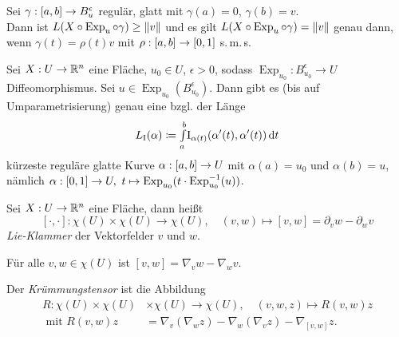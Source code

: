 \documentclass{cheat-sheet}
\newcommand{\FFI}{\mathrm{I}} %
\DeclareMathOperator{\Exp}{Exp} %
\begin{document}

\begin{satz}
  Sei $\gamma : \left[ a, b \right] \to B_u^\epsilon$ regulär, glatt mit $\gamma(a) = 0$, $\gamma(b) = v$. \\
  Dann ist $L(X \circ \Exp_u \circ \gamma) \geq \norm{v}$ und es gilt $L(X \circ \Exp_u \circ \gamma) = \norm{v}$ genau dann, wenn $\gamma(t) = \rho(t)v$ mit $\rho : \left[ a, b \right] \to \left[ 0, 1 \right]$ s.\,m.\,s.
\end{satz}

\begin{satz}
  Sei $X : U \to \mathbb{R}^n$ eine Fläche, $u_0 \in U$, $\epsilon > 0$, sodass $\Exp_{u_0} : B_{u_0}^{\epsilon} \to U$ Diffeomorphismus. Sei $u \in \Exp_{u_0}(B_{u_0}^{\epsilon})$. Dann gibt es (bis auf Umparametrisierung) genau eine bzgl. der Länge
  \[ L_\FFI(\alpha) \coloneqq \Int{a}{b}{\FFI_{\alpha(t)}(\alpha'(t), \alpha'(t))}{t} \]
  kürzeste reguläre glatte Kurve $\alpha : \left[ a, b \right] \to U$ mit $\alpha(a) = u_0$ und $\alpha(b) = u$, nämlich $\alpha : \cinterval{0}{1} \to U, \  t \mapsto \Exp_{u_0}(t \cdot \Exp_{u_0}^{-1}(u))$.
\end{satz}



\begin{defn}
  Sei $X : U \to \mathbb{R}^n$ eine Fläche, dann heißt
  \[
    [\cdot,\cdot] : \chi(U) \times \chi(U) \to \chi(U), \quad
    (v, w) \mapsto [v, w] = \partial_v w - \partial_w v
  \]
  \emph{Lie-Klammer} der Vektorfelder $v$ und $w$.
\end{defn}

\begin{satz}
  Für alle $v, w \in \chi(U)$ ist $[v, w] = \nabla_v w - \nabla_w v$.
\end{satz}


\begin{defn}
  Der \emph{Krümmungstensor} ist die Abbildung
  \begin{align*}
    R : \chi(U) \times \chi(U) &\times \chi(U) \to \chi(U), \quad (v, w, z) \mapsto R(v, w) z \\
    \text{ mit } R(v, w) z &= \nabla_v (\nabla_w z) - \nabla_w (\nabla_v z) - \nabla_{[v, w]} z.
  \end{align*}
\end{defn}
\end{document}
